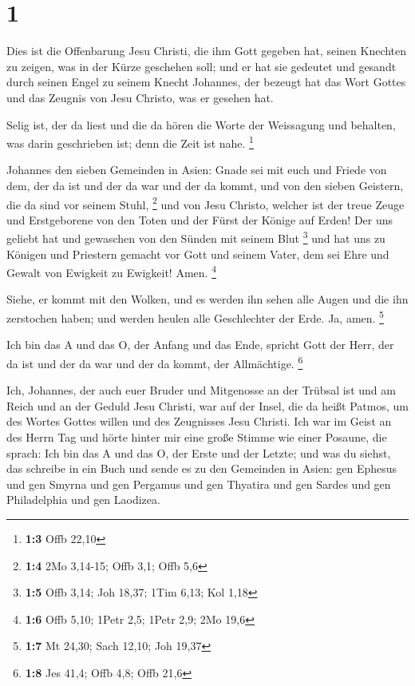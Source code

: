 \hypertarget{section}{%
\section{1}\label{section}}

 Dies ist die Offenbarung Jesu Christi, die ihm Gott
gegeben hat, seinen Knechten zu zeigen, was in der Kürze geschehen soll;
und er hat sie gedeutet und gesandt durch seinen Engel zu seinem Knecht
Johannes,  der bezeugt hat das Wort Gottes und das Zeugnis
von Jesu Christo, was er gesehen hat.

 Selig ist, der da liest und die da hören die Worte der
Weissagung und behalten, was darin geschrieben ist; denn die Zeit ist
nahe. \footnote{\textbf{1:3} Offb 22,10}

 Johannes den sieben Gemeinden in Asien: Gnade sei mit
euch und Friede von dem, der da ist und der da war und der da kommt, und
von den sieben Geistern, die da sind vor seinem Stuhl, \footnote{\textbf{1:4}
  2Mo 3,14-15; Offb 3,1; Offb 5,6}  und von Jesu Christo,
welcher ist der treue Zeuge und Erstgeborene von den Toten und der Fürst
der Könige auf Erden! Der uns geliebt hat und gewaschen von den Sünden
mit seinem Blut \footnote{\textbf{1:5} Offb 3,14; Joh 18,37; 1Tim 6,13;
  Kol 1,18}  und hat uns zu Königen und Priestern gemacht
vor Gott und seinem Vater, dem sei Ehre und Gewalt von Ewigkeit zu
Ewigkeit! Amen. \footnote{\textbf{1:6} Offb 5,10; 1Petr 2,5; 1Petr 2,9;
  2Mo 19,6}

 Siehe, er kommt mit den Wolken, und es werden ihn sehen
alle Augen und die ihn zerstochen haben; und werden heulen alle
Geschlechter der Erde. Ja, amen. \footnote{\textbf{1:7} Mt 24,30; Sach
  12,10; Joh 19,37}

 Ich bin das A und das O, der Anfang und das Ende, spricht
Gott der Herr, der da ist und der da war und der da kommt, der
Allmächtige. \footnote{\textbf{1:8} Jes 41,4; Offb 4,8; Offb 21,6}

 Ich, Johannes, der auch euer Bruder und Mitgenosse an der
Trübsal ist und am Reich und an der Geduld Jesu Christi, war auf der
Insel, die da heißt Patmos, um des Wortes Gottes willen und des
Zeugnisses Jesu Christi.  Ich war im Geist an des Herrn
Tag und hörte hinter mir eine große Stimme wie einer Posaune,
 die sprach: Ich bin das A und das O, der Erste und der
Letzte; und was du siehst, das schreibe in ein Buch und sende es zu den
Gemeinden in Asien: gen Ephesus und gen Smyrna und gen Pergamus und gen
Thyatira und gen Sardes und gen Philadelphia und gen Laodizea.

